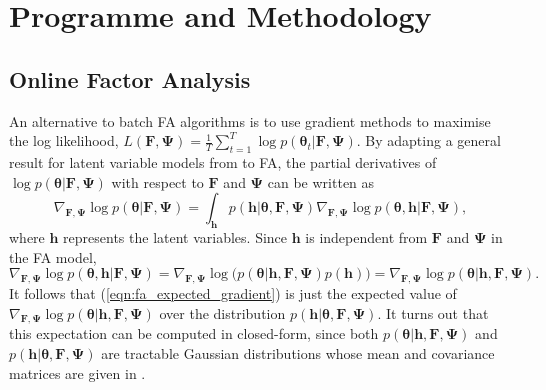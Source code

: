 \documentclass[a4paper,11pt]{article}
\newcommand{\matr}[1]{\mathbf{#1}}
\newcommand{\bgreek}[1]{\boldsymbol{#1}}
\begin{document}
\section{Programme and Methodology}\label{sec:methodology}

\subsection{Online Factor Analysis}\label{sec:online_fa}


An alternative to batch FA algorithms is to use gradient methods to maximise the log likelihood, $ L(\matr{F}, \matr{\Psi}) = \frac{1}{T} \sum_{t=1}^T \log p(\bgreek{\theta}_t | \matr{F}, \matr{\Psi})$. By adapting a general result for latent variable models from \cite{barber2007} to FA, the partial derivatives of $\log p(\bgreek{\theta} | \matr{F}, \matr{\Psi})$ with respect to $\matr{F}$ and $\matr{\Psi}$ can be written as 
\begin{equation}\label{eqn:fa_expected_gradient}
	\nabla_{\matr{F}, \matr{\Psi}} \log p(\bgreek{\theta} | \matr{F}, \matr{\Psi})
	= \int_\matr{h} p(\matr{h} | \bgreek{\theta}, \matr{F}, \matr{\Psi}) \nabla_{\matr{F}, \matr{\Psi}} \log p(\bgreek{\theta}, \matr{h} | \matr{F}, \matr{\Psi}),
\end{equation}
where $\matr{h}$ represents the latent variables. Since $\matr{h}$ is independent from $\matr{F}$ and $\matr{\Psi}$ in the FA model,
\begin{equation}\label{eqn:fa_log_complete_likliehood}
	\nabla_{\matr{F}, \matr{\Psi}} \log p(\bgreek{\theta}, \matr{h} | \matr{F}, \matr{\Psi})
	= \nabla_{\matr{F}, \matr{\Psi}} \log \Big(p(\bgreek{\theta} | \matr{h}, \matr{F}, \matr{\Psi})p(\matr{h})\Big)
	= \nabla_{\matr{F}, \matr{\Psi}} \log p(\bgreek{\theta} | \matr{h}, \matr{F}, \matr{\Psi}).
\end{equation}
It follows that (\ref{eqn:fa_expected_gradient}) is just the expected value of $\nabla_{\matr{F}, \matr{\Psi}} \log p(\bgreek{\theta} | \matr{h}, \matr{F}, \matr{\Psi})$ over the distribution $p(\matr{h} | \bgreek{\theta}, \matr{F}, \matr{\Psi})$. It turns out that this expectation can be computed in closed-form, since both $p(\bgreek{\theta} | \matr{h}, \matr{F}, \matr{\Psi})$ and $p(\matr{h} | \bgreek{\theta}, \matr{F}, \matr{\Psi})$ are tractable Gaussian distributions whose mean and covariance matrices are given in \cite{barber2007}. 
\end{document}
